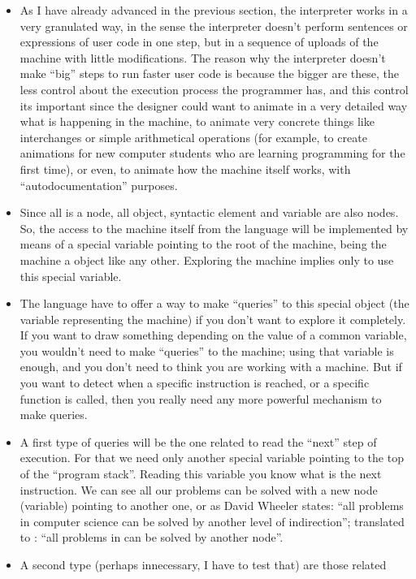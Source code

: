 \documentclass{article}
\begin{document}
\begin{itemize}
\item As I have already advanced in the previous section, the interpreter works
  in a very granulated way, in the sense the interpreter doesn't perform
  sentences or expressions of user code in one step, but in a sequence of
  uploads of the machine with little modifications. The reason why the
  interpreter doesn't make ``big'' steps to run faster user code is because the
  bigger are these, the less control about the execution process the programmer
  has, and this control its important since the designer could want to animate
  in a very detailed way what is happening in the machine, to animate very
  concrete things like interchanges or simple arithmetical operations (for
  example, to create animations for new computer students who are learning
  programming for the first time), or even, to animate how the machine itself
  works, with ``autodocumentation'' purposes.
\item Since all is a node, all object, syntactic element and variable are also
  nodes. So, the access to the machine itself from the language will be
  implemented by means of a special variable pointing to the root of the
  machine, being the machine a \faupp object like any other. Exploring the
  machine implies only to use this special variable.
\item The language have to offer a way to make ``queries'' to this special
  object (the variable representing the machine) if you don't want to explore it
  completely. If you want to draw something depending on the value of a common
  variable, you wouldn't need to make ``queries'' to the machine; using that
  variable is enough, and you don't need to think you are working with a
  machine. But if you want to detect when a specific instruction is reached, or
  a specific function is called, then you really need any more powerful
  mechanism to make queries.
\item A first type of queries will be the one related to read the ``next'' step
  of execution. For that we need only another special variable pointing to the
  top of the ``program stack''. Reading this variable you know what is the next
  instruction. We can see all our problems can be solved with a new node
  (variable) pointing to another one, or as David Wheeler states: ``all problems
  in computer science can be solved by another level of indirection'';
  translated to \fav: ``all problems in \fav can be solved by another node''.
\item A second type (perhaps innecessary, I have to test that) are those related

\end{itemize}
\end{document}
